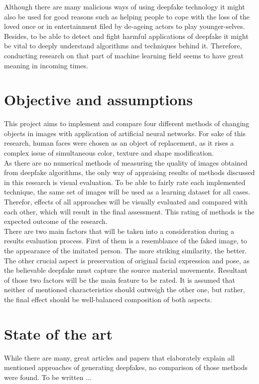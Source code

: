 Although there are many malicious ways of using deepfake technology it might also be used for good reasons such as helping people to cope with the loss of the loved once or in entertainment filed by de-ageing actors to play younger-selves. Besides, to be able to detect and fight harmful applications of deepfake it might be vital to deeply understand algorithms  and techniques behind it. Therefore, conducting research on that part of machine learning field seems to have great meaning in incoming times.

\section{Objective and assumptions}
This project aims to implement and compare four different methods of changing objects in images with application of artificial neural networks. For sake of this research, human faces were chosen as an object of replacement, as it rises a complex issue of simultaneous color, texture and shape modification.\\

As there are no numerical methods of measuring the quality of images obtained from deepfake algorithms, the only way of appraising results of methods discussed in this research is visual evaluation. To be able to fairly rate each implemented technique, the same set of images will be used as a learning dataset for all cases. Therefor, effects of all approaches will be visually evaluated and compared with each other, which will result in the final assessment. This rating of methods is the expected outcome of the research.\\

There are two main factors that will be taken into a consideration during a results evaluation process. First of them is a resemblance of the faked image, to the appearance of the imitated person. The more striking similarity, the better. The other crucial aspect is preservation of original facial expression and pose, as the believable deepfake must capture the source material movements. Resultant of those two factors will be the main feature to be rated. It is assumed that neither of mentioned characteristics should outweigh the other one, but rather, the final effect should be well-balanced composition of both aspects.

\section{State of the art}
While there are many, great articles and papers that elaborately explain all mentioned approaches of generating deepfakes, no comparison of those methods were found. To be written ...

